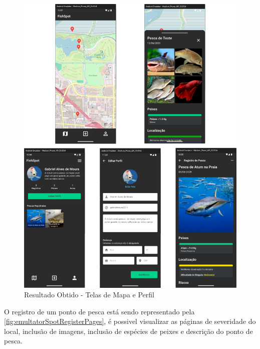 \begin{figure}[H]
    \centering
    \caption{Resultado Obtido - Telas de Mapa e Perfil}
    \label{fig:emultatorMapAndPerfilPages}
    \includegraphics[scale=0.35]{./dados/figuras/emulator-map-and-profile-pages.png}
\end{figure}

O registro de um ponto de pesca está sendo representado pela \autoref{fig:emultatorSpotRegisterPages}, é possivel visualizar as páginas de severidade do local, inclusão de imagens, inclusão de espécies de peixes e descrição do ponto de pesca.

